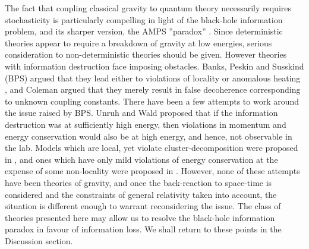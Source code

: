 \documentclass[aps,pra,showpacs,citeautoscript,amsmath,amssymb,floatfix,superscriptaddress,bbm, verbatim,amsfonts,changes,12pt,nofootinbib,longbibliography]{revtex4-2}
\begin{document}
The fact that coupling classical gravity to quantum theory necessarily requires stochasticity\cite{stochasticity_foot} %
 is particularly compelling in light of the black-hole information problem\cite{hawking-bhinfoloss,hawking-unpredictability,preskill-infoloss-note}, and its sharper version, the AMPS ''paradox'' \cite{almheiri2013black,braunstein2009entangled}. Since deterministic theories appear to require a breakdown of gravity at low energies\cite{energies_foot}, serious consideration to non-deterministic theories should be given\cite{ellis1984search}. However theories with information destruction face imposing obstacles. \label{par:introchallenge} Banks, Peskin and Susskind (BPS) argued that they lead either to violations of locality or anomalous heating
\cite{bps,gross1984quantum}, and Coleman argued that they merely result in false decoherence corresponding to unknown coupling constants\cite{coleman1988black}. 
\label{par:ibps}There have been a few attempts to work around the issue raised by BPS. 
Unruh and Wald proposed that if the
information destruction was at sufficiently high energy, then violations in momentum and energy conservation 
would also be at high energy, and hence, not observable in the lab\cite{unruh-wald-onbps}. Models which are local, yet violate 
cluster-decomposition\cite{cluster_foot}
were proposed in \cite{OR-intrinsic}, and ones which have only mild violations of energy conservation at the expense of some non-locality were proposed in \cite{poulinKITP}. 
However, none of these attempts have been theories of gravity, and once the back-reaction to space-time is considered and the constraints of general relativity taken into account, the situation is different enough to warrant reconsidering the issue. The class of theories presented here may allow us to resolve the black-hole information paradox in favour of information loss. We shall return to these points in the Discussion section.
\end{document}
